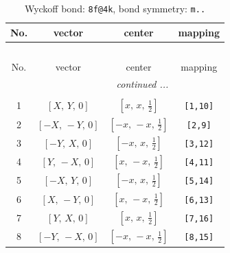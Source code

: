 \documentclass[fleqn,8pt]{jsarticle}
\begin{document}
\begin{longtable}{cccc}
\caption{Wyckoff bond: {\tt 8f@4k}, bond symmetry: {\tt m..}}
 \\
 \hline \hline
No. & vector & center & mapping \\ \hline \endfirsthead

\multicolumn{3}{l}{\tablename\ \thetable{}} \\
 \hline \hline
No. & vector & center & mapping \\ \hline \endhead

 \hline \hline
\multicolumn{3}{r}{\footnotesize\it continued ...} \\ \endfoot

 \hline \hline
\multicolumn{3}{r}{} \\ \endlastfoot

1 & $\left[ X,\, Y,\, 0 \right]$ & $\left[ x,\, x,\, \frac{1}{2} \right]$ & {\tt [1,10]} \\ \hline
2 & $\left[ - X,\, - Y,\, 0 \right]$ & $\left[ - x,\, - x,\, \frac{1}{2} \right]$ & {\tt [2,9]} \\ \hline
3 & $\left[ - Y,\, X,\, 0 \right]$ & $\left[ - x,\, x,\, \frac{1}{2} \right]$ & {\tt [3,12]} \\ \hline
4 & $\left[ Y,\, - X,\, 0 \right]$ & $\left[ x,\, - x,\, \frac{1}{2} \right]$ & {\tt [4,11]} \\ \hline
5 & $\left[ - X,\, Y,\, 0 \right]$ & $\left[ - x,\, x,\, \frac{1}{2} \right]$ & {\tt [5,14]} \\ \hline
6 & $\left[ X,\, - Y,\, 0 \right]$ & $\left[ x,\, - x,\, \frac{1}{2} \right]$ & {\tt [6,13]} \\ \hline
7 & $\left[ Y,\, X,\, 0 \right]$ & $\left[ x,\, x,\, \frac{1}{2} \right]$ & {\tt [7,16]} \\ \hline
8 & $\left[ - Y,\, - X,\, 0 \right]$ & $\left[ - x,\, - x,\, \frac{1}{2} \right]$ & {\tt [8,15]} \\
\end{longtable}
\renewcommand{\arraystretch}{1.2}
\end{document}
